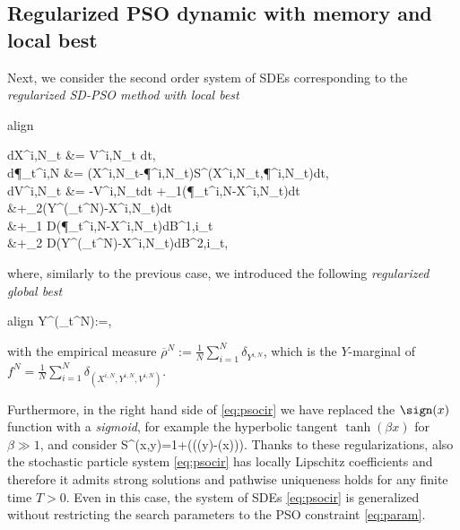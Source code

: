 \documentclass{ims9x6}
\newcommand{\coloredeq}[2]{\begin{empheq}[box={\mymath[colback=gray!13, sharp corners]}]{align}\label{#1}#2\end{empheq}}
\renewcommand{\bar}{\overline}
\newcommand{\TE}{\mathcal{F}}
\newcommand{\RR}{\mathbb{R}}
\begin{document}
\subsection{Regularized PSO dynamic with memory and local best}
Next, we consider the second order system of SDEs corresponding to the \emph{regularized SD-PSO method with local best} 
\coloredeq{eq:psocir}{
\begin{split}
dX^{i,N}_t &= V^{i,N}_t dt,\\
d\P_t^{i,N} &= \nu \left(X^{i,N}_t-\P^{i,N}_t\right)S^\beta(X^{i,N}_t,\P^{i,N}_t)dt,\\
\iw dV^{i,N}_t &= -\gamma V^{i,N}_tdt +\lambda_1\left(\P_t^{i,N}-X^{i,N}_t\right)dt \\
&\quad +\lambda_2\left(Y^\alpha(\bar \rho_t^N)-X^{i,N}_t\right)dt\\
&\quad +\sigma_1 D(\P_t^{i,N}-X^{i,N}_t)dB^{1,i}_t\\
&\quad +\sigma_2 D(Y^\alpha(\bar \rho_t^N)-X^{i,N}_t)dB^{2,i}_t,
\end{split}} 
where, similarly to the previous case, we  introduced the following \emph{regularized global best}  
\coloredeq{ValphaE2}{
{Y}^{\alpha}(\bar \rho_t^{N}):=\frac{\int_{\RR^d}y\omega_{\alpha}^{\mc{E}}(y)\bar\rho_t^{N}(dy)}{\int_{\RR^d}\omega_{\alpha}^{\mc{E}}(y)\rho_t^{N}(dy)},
}
with  the empirical measure $\bar \rho^N:=\frac{1}{N}\sum_{i=1}^{N}\delta_{Y^{i,N}}$, which is the $Y$-marginal of
$f^N=\frac{1}{N}\sum_{i=1}^{N}\delta_{(X^{i,N},Y^{i,N},V^{i,N})}$.

Furthermore, in the right hand side of \eqref{eq:psocir} we have replaced the $\sign(x)$ function with a \emph{sigmoid}, for example the hyperbolic tangent $\tanh(\beta x)$ for $\beta\gg 1$, and consider 
\be
S^\beta(x,y)=1+\tanh\left(\beta(\TE(y)-\TE(x))\right).
\ee 
Thanks to these regularizations, also the stochastic particle system \eqref{eq:psocir} has locally Lipschitz coefficients and therefore it admits strong solutions and pathwise uniqueness holds for any finite time $T>0$. Even in this case, the system of SDEs \eqref{eq:psocir} is generalized without restricting the search parameters to the PSO constraint \eqref{eq:param}.  

\end{document}
